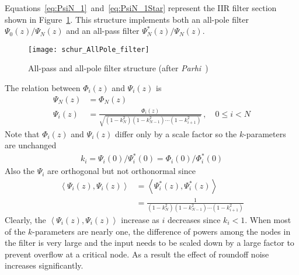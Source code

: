 \documentclass[a4paper,twoside,10pt,english]{report}
\begin{document}
Equations~\ref{eq:PsiN_1}~and~\ref{eq:PsiN_1Star} represent the IIR
filter section shown in Figure~\ref{fig:All-pass-and-all-pole}.
This structure implements both an all-pole filter $\Psi_{0}\left(z\right)/\Psi_{N}\left(z\right)$
and an all-pass filter $\Psi_{N}^{*}\left(z\right)/\Psi_{N}\left(z\right)$.
\begin{figure}[!htbp]
\begin{center}
\texttt{[image: schur\_AllPole\_filter]}
\caption{All-pass and all-pole filter structure (after 
\emph{Parhi}~\cite[Fig. 12.5]{Parhi_VLSIDigitalSignalProcessingSystems})}
\label{fig:All-pass-and-all-pole}
\end{center}
\end{figure}
The relation between $\Phi_{i}\left(z\right)$ and $\Psi_{i}\left(z\right)$
is 
\begin{align*}
\Psi_{N}\left(z\right) & = \Phi_{N}\left(z\right)\\
\Psi_{i}\left(z\right) & = \frac{\Phi_{i}\left(z\right)}{\sqrt{\left(1-k_{N}^{2}\right)\left(1-k_{N-1}^{2}\right)\cdots\left(1-k_{i+1}^{2}\right)}}\,,\quad0\leq i < N
\end{align*}
Note that $\Phi_{i}\left(z\right)$ and $\Psi_{i}\left(z\right)$
differ only by a scale factor so the $k$-parameters are unchanged
\begin{align*}
k_{i}=\Psi_{i}\left(0\right)/\Psi_{i}^{*}\left(0\right)=\Phi_{i}\left(0\right)/\Phi_{i}^{*}\left(0\right)
\end{align*}
 Also the $\Psi_{i}$ are orthogonal but not orthonormal since
\begin{align*}
\left\langle \Psi_{i}\left(z\right),\Psi_{i}\left(z\right)\right\rangle  & = \left\langle \Psi_{i}^{*}\left(z\right),\Psi_{i}^{*}\left(z\right)\right\rangle \\
 & = \frac{1}{\left(1-k_{N}^{2}\right)\left(1-k_{N-1}^{2}\right)\cdots\left(1-k_{i+1}^{2}\right)}
\end{align*}
Clearly, the $\left\langle \Psi_{i}\left(z\right),\Psi_{i}\left(z\right)\right\rangle $
increase as $i$ decreases since $k_{i}<1$. When most of the $k$-parameters
are nearly one, the difference of powers among the nodes in the filter
is very large and the input needs to be scaled down by a large factor
to prevent overflow at a critical node. As a result the effect of
roundoff noise increases significantly.
\end{document}
